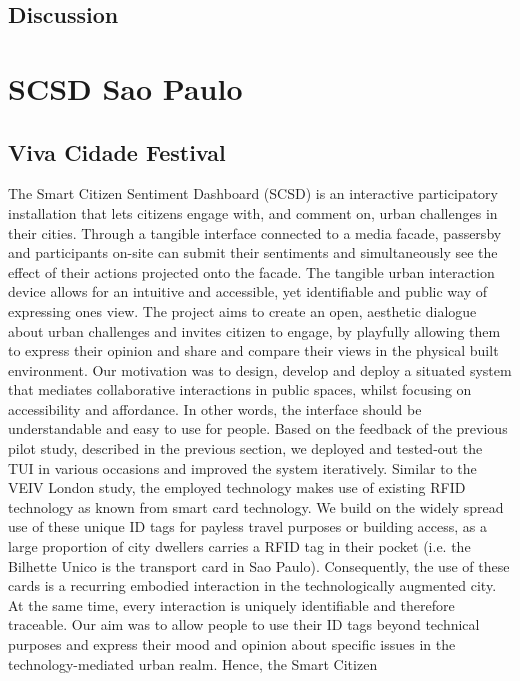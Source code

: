 \subsection{Discussion}



\section{SCSD Sao Paulo}

\subsection{Viva Cidade Festival}

The Smart Citizen Sentiment Dashboard (SCSD) is an interactive participatory
installation that lets citizens engage with, and comment on, urban challenges in
their cities. Through a tangible interface connected to a media facade, passersby
and participants on-site can submit their sentiments and simultaneously see
the effect of their actions projected onto the facade. The tangible urban interaction
device allows for an intuitive and accessible, yet identifiable and public way
of expressing ones view. The project aims to create an open, aesthetic dialogue
about urban challenges and invites citizen to engage, by playfully allowing them
to express their opinion and share and compare their views in the physical built
environment.
Our motivation was to design, develop and deploy a situated system that mediates
collaborative interactions in public spaces, whilst focusing on accessibility
and affordance. In other words, the interface should be understandable and easy
to use for people. Based on the feedback of the previous pilot study, described in
the previous section, we deployed and tested-out the TUI in various occasions and
improved the system iteratively. Similar to the VEIV London study, the employed
technology makes use of existing RFID technology as known from smart card
technology. We build on the widely spread use of these unique ID tags for payless
travel purposes or building access, as a large proportion of city dwellers carries
a RFID tag in their pocket (i.e. the Bilhette Unico is the transport card in
Sao Paulo). Consequently, the use of these cards is a recurring embodied interaction
in the technologically augmented city. At the same time, every interaction is
uniquely identifiable and therefore traceable. Our aim was to allow people to use
their ID tags beyond technical purposes and express their mood and opinion about
specific issues in the technology-mediated urban realm. Hence, the Smart Citizen
